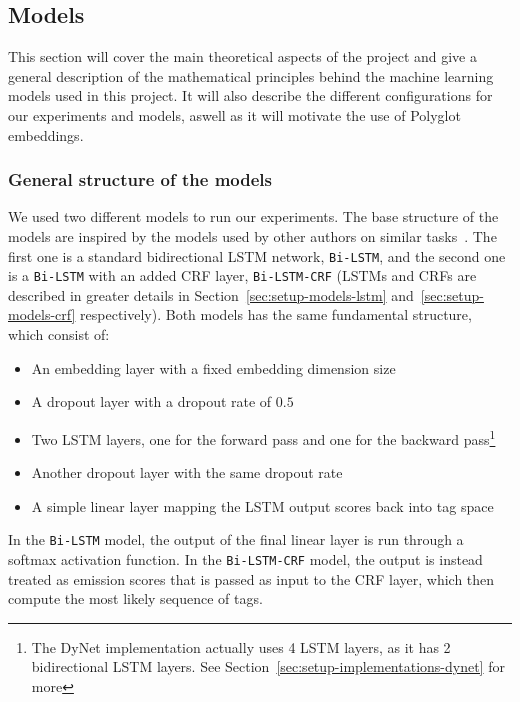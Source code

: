 
\subsection{Models}

This section will cover the main theoretical aspects of the project and give a
general description of the mathematical principles behind the machine learning
models used in this project. It will also describe the different configurations
for our experiments and models, aswell as it will motivate the use of Polyglot
embeddings.


\subsubsection{General structure of the models}

We used two different models to run our experiments. The base structure of the
models are inspired by the models used by other authors on similar
tasks~\cite{ALL THE PAPERS!}. The first one is a standard bidirectional LSTM
network, \texttt{Bi-LSTM}, and the second one is a \texttt{Bi-LSTM} with an
added CRF layer, \texttt{Bi-LSTM-CRF} (LSTMs and CRFs are described in greater
details in Section~\ref{sec:setup-models-lstm} and~\ref{sec:setup-models-crf}
respectively). Both models has the same fundamental structure, which consist of:

\begin{itemize}
    \item An embedding layer with a fixed embedding dimension size
    \item A dropout layer with a dropout rate of $0.5$
    \item Two LSTM layers, one for the forward pass and one for the backward
        pass\footnote{The DyNet implementation actually uses 4 LSTM layers, as
            it has 2 bidirectional LSTM layers. See
        Section~\ref{sec:setup-implementations-dynet} for more}
    \item Another dropout layer with the same dropout rate
    \item A simple linear layer mapping the LSTM output scores back into tag
        space
\end{itemize}

In the \texttt{Bi-LSTM} model, the output of the final linear layer is run
through a softmax activation function. In the \texttt{Bi-LSTM-CRF} model, the
output is instead treated as emission scores that is passed as input to the CRF
layer, which then compute the most likely sequence of tags.

